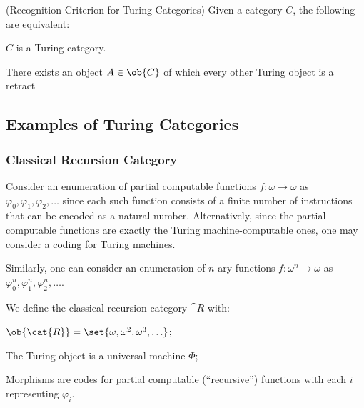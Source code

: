 
\begin{theorem} (Recognition Criterion for Turing Categories)
  Given a category $C$, the following are equivalent:
  \begin{enumarabic}
    \item $C$ is a Turing category.
    \item There exists an object $A \in \ob{C}$ of which every other
      Turing object is a retract
  \end{enumarabic}
\end{theorem}

\step
\subsection{Examples of Turing Categories}

\subsubsection{Classical Recursion Category}

  Consider an enumeration
  of partial computable functions $f : \omega \to \omega$ as
  $\varphi_0, \varphi_1, \varphi_2, \ldots$
  since each such function consists of a finite number of
  instructions that can be encoded as a natural number.
  Alternatively, since the partial computable functions
  are exactly the Turing machine-computable ones, one may
  consider a coding for Turing machines.

  Similarly, one can consider an enumeration of $n$-ary functions
  $f : \omega^n \to \omega$ as $\varphi_0^n, \varphi_1^n, \varphi_2^n, \ldots$.

  We define the classical recursion category $\cat{R}$ with:
  \begin{enumarabic}
    \item $\ob{\cat{R}} = \set{\omega, \omega^2, \omega^3, \ldots}$;
    \item The Turing object is a universal machine $\Phi$;
    \item Morphisms are codes for partial computable (``recursive'') functions
      with each $i$ representing $\varphi_i$.
  \end{enumarabic}

